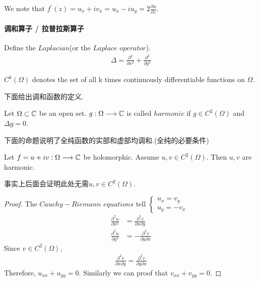 \begin{rmk}
	We note that $f^{'}(z) = u_x + i v_x = u_x - i u_y = 2 \frac{\partial u}{\partial z}$.
\end{rmk}

\newpage
\paragraph{调和算子 / 拉普拉斯算子}
Define the \underline{$Laplacian$}(or the \underline{$Laplace \,\, operator$}).
\begin{align}
	\Delta = \frac{\partial^2}{\partial x^2} + \frac{\partial^2}{\partial y^2}
\end{align}

\begin{rmk}
	$C^{k}(\Omega)$ denotes the set of all k times continuously differentiable functions on $\Omega$.
\end{rmk}

\vspace{2em}
下面给出调和函数的定义.
\begin{defn}\label{def 2.5.1}
	Let $\Omega \subset \mathbb{C}$ be an open set. $g : \Omega \longrightarrow \mathbb{C}$ is called \underline{$harmonic$} if $g \in C^{2}(\Omega)$ and $\Delta g = 0$.
\end{defn}

\vspace{2em}
下面的命题说明了全纯函数的实部和虚部均调和.(全纯的必要条件)
\begin{proposition}\label{prop 2.5.2}
	Let $f = u + i v : \Omega \longrightarrow \mathbb{C}$ be holomorphic. Assume $u , v \in C^{2}(\Omega)$. Then $u , v$ are harmonic.
	
	\begin{rmk}
		事实上后面会证明此处无需$u , v \in C^{2}(\Omega)$.
	\end{rmk}
	
	\vspace{2em}
	\begin{proof}
		The $Cauchy - Riemann \,\, equations$ tell $
		\begin{cases}
			u_x = v_y \\
			u_y = - v_x
		\end{cases}$
		\begin{align}
			\frac{\partial^2 u}{\partial x^2} &= \frac{\partial^2 v}{\partial x \partial y} \\
			\frac{\partial^2 u}{\partial y^2} &= -\frac{\partial^2 v}{\partial y \partial x}
		\end{align}
		Since $v \in C^{2}(\Omega)$, 
		\begin{align}
			\frac{\partial^2 v}{\partial x \partial y} = \frac{\partial^2 v}{\partial y \partial x}
		\end{align}
		Therefore, $u_{xx} + u_{yy} = 0$. Similarly we can proof that $v_{xx} + v_{yy} = 0$.
	\end{proof}
\end{proposition}

